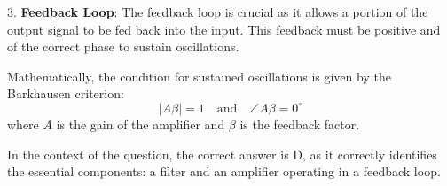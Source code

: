 3. \textbf{Feedback Loop}: The feedback loop is crucial as it allows a portion of the output signal to be fed back into the input. This feedback must be positive and of the correct phase to sustain oscillations.

Mathematically, the condition for sustained oscillations is given by the Barkhausen criterion:
\[
|A \beta| = 1 \quad \text{and} \quad \angle A \beta = 0^\circ
\]
where \( A \) is the gain of the amplifier and \( \beta \) is the feedback factor.

In the context of the question, the correct answer is D, as it correctly identifies the essential components: a filter and an amplifier operating in a feedback loop.

